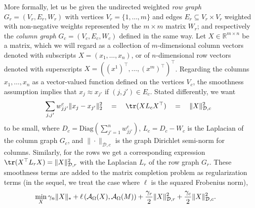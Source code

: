 \documentclass{article}
\begin{document}
More formally, let us be given the undirected weighted {\em row graph} $G_r = (V_r, E_r, W_r)$ with vertices $V_r = \{1, \hdots, m\}$ and edges $E_r \subseteq V_r \times V_r$ weighted with non-negative weights represented by the $m \times m$  matrix $W_r$; and respectively the {\em column graph} $G_c = (V_c, E_c, W_c)$ defined in the same way.  Let $X \in \mathbb{R}^{m\times n}$ be a matrix, which we will regard as a collection of $m$-dimensional column vectors denoted with subscripts $X = (x_1, \hdots, x_n)$, or of $n$-dimensional row vectors denoted with superscripts $X = ((x^1)^\top, \hdots,  (x^m)^\top)^\top$. Regarding the columns $x_1, \hdots, x_n$ as a vector-valued function defined on the vertices $V_c$, the smoothness assumption implies that $x_j \approx x_{j'}$ if $(j,j') \in E_c$. Stated differently, we want 
\vspace{-0.15cm}
\begin{eqnarray}
\sum_{j,j'} w^c_{jj'} \| x_j - x_{j'} \|_2^2 \quad = \quad \tr(X L_c X^\top) \quad = \quad \|X\|^2_{\mathcal{D},c}
\label{eq:priorc}
\end{eqnarray}
\vspace{-0.07cm}to be small, where $D_c=\mathrm{Diag}(\sum_{j'=1}^n w^c_{jj'})$, $L_c = D_c - W_c$ is the Laplacian of the column graph $G_c$, and $\|\cdot\|_{\mathcal{D},c}$ is the graph Dirichlet semi-norm for columns. Similarly, for the rows we get a corresponding expression $\tr(X^\top L_r X)=\|X\|^2_{\mathcal{D},r}$ with the Laplacian $L_r$ of the row graph $G_r$. These smoothness terms are added to the matrix completion problem as regularization terms (in the sequel, we treat the case where $\ell$ is the squared Frobenius norm), 
\vspace{-0.07cm}
\begin{align}
&\min_X 				\gamma_n\|X\|_* + \ell\left({\cal A}_{\Omega}(X), {\cal A}_{\Omega}(M)\right) +  \frac{\gamma_r}{2} \|X\|^2_{\mathcal{D},r} + \frac{\gamma_c}{2} \|X\|^2_{\mathcal{D},c}. \label{eq:problem2}
\end{align}
\vspace{-0.55cm}
\end{document}
